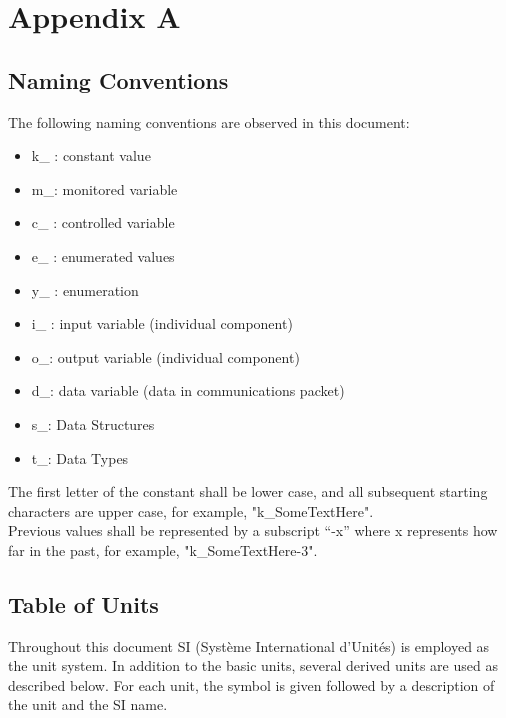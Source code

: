 \documentclass[12pt]{article}
\begin{document}
\newpage
\section{Appendix A}
\subsection{Naming Conventions}
The following naming conventions are observed in this document:
\begin{itemize}
    \item k\_ : constant value
    \item m\_: monitored variable
    \item c\_ : controlled variable
    \item e\_ : enumerated values
    \item y\_ : enumeration
    \item i\_ : input variable (individual component)
    \item o\_: output variable (individual component)
    \item d\_: data variable (data in communications packet)
    \item s\_: Data Structures
    \item t\_: Data Types
\end{itemize}
The first letter of the constant shall be lower case, and all subsequent starting characters
are upper case, for example, "k\_SomeTextHere". \\
Previous values shall be represented by a subscript “-x” where x represents how far in the
past, for example, "k\_SomeTextHere-3".

\subsection{Table of Units}
Throughout this document SI (Syst\`{e}me International d'Unit\'{e}s) is employed
as the unit system.  In addition to the basic units, several derived units are
used as described below.  For each unit, the symbol is given followed by a
description of the unit and the SI name.
~\newline
\end{document}
